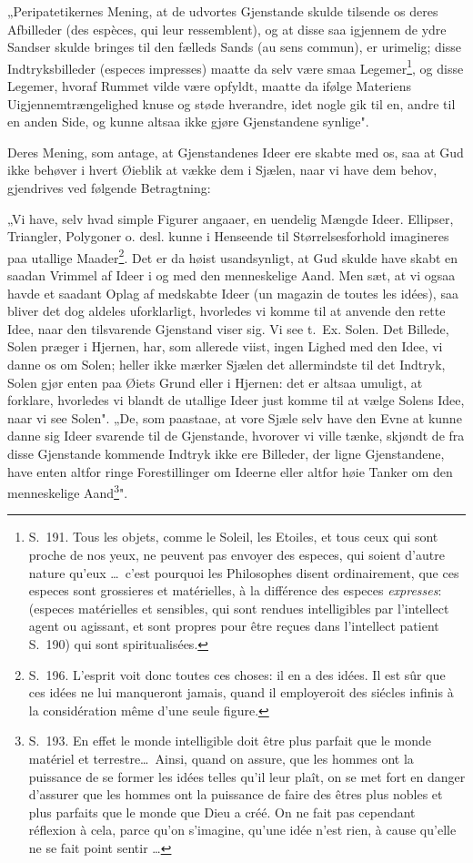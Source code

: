 \documentclass[12pt,a4paper]{article}
\newcommand{\opage}[1]{\marginnote{\footnotesize\textit{[#1]}}}
\begin{document}
„Peripatetikernes Mening, at de udvortes Gjenstande skulde tilsende os deres
Afbilleder (des espèces, qui leur ressemblent), og at disse saa igjennem de ydre
Sandser skulde bringes til den fælleds Sands (au sens commun),
\opage{14} er urimelig; disse Indtryksbilleder (especes impresses) maatte da selv være smaa
Legemer\footnote{S.~191. Tous les objets, comme le Soleil, les Etoiles, et tous
ceux qui sont proche de nos yeux, ne peuvent pas envoyer des especes, qui soient
d'autre nature qu'eux \dots\ c'est pourquoi les Philosophes disent ordinairement,
que ces especes sont grossieres et matérielles, à la différence des especes
\emph{expresses}: (especes matérielles et sensibles, qui sont rendues
intelligibles par l'intellect agent ou agissant, et sont propres pour être
reçues dans l'intellect patient S.~190) qui sont spiritualisées.}, og disse
Legemer, hvoraf Rummet vilde være opfyldt, maatte da ifølge Materiens
Uigjennemtrængelighed knuse og støde hverandre, idet nogle gik til en, andre til
en anden Side, og kunne altsaa ikke gjøre Gjenstandene synlige".

Deres Mening, som antage, at Gjenstandenes Ideer ere skabte med os, saa at Gud
ikke behøver i hvert Øieblik at vække dem i Sjælen, naar vi have dem behov,
gjendrives ved følgende Betragtning:

„Vi have, selv hvad simple Figurer angaaer, en uendelig Mængde Ideer. Ellipser,
Triangler, Polygoner o. desl. kunne i Henseende til Størrelsesforhold imagineres
paa utallige Maader\footnote{S.~196. L'esprit voit donc toutes ces choses: il en
a des idées. Il est sûr que ces idées ne lui manqueront jamais, quand il
employeroit des siécles infinis à la considération même d'une seule figure.}. Det
er da høist usandsynligt, at Gud skulde have skabt en saadan Vrimmel af Ideer i
og med den menneskelige Aand. Men sæt, at vi ogsaa havde et saadant Oplag af
medskabte Ideer (un magazin de toutes les idées), saa bliver det dog aldeles
uforklarligt, hvorledes vi komme til at anvende den rette Idee, naar den
tilsvarende Gjenstand viser sig. Vi see t.~Ex. Solen. Det Billede, Solen præger
i Hjernen, har, som allerede viist, ingen Lighed med den Idee, vi danne os om
Solen; heller ikke mærker Sjælen det allermindste til det Indtryk, Solen gjør
enten paa Øiets Grund eller i Hjernen: det er altsaa umuligt, at forklare,
hvorledes vi blandt de utallige Ideer just komme til at vælge Solens Idee, naar
vi see Solen".
\opage{15} „De, som paastaae, at vore Sjæle selv have den Evne at kunne danne sig Ideer
svarende til de Gjenstande, hvorover vi ville tænke, skjøndt de fra disse
Gjenstande kommende Indtryk ikke ere Billeder, der ligne Gjenstandene, have
enten altfor ringe Forestillinger om Ideerne eller altfor høie Tanker om den
menneskelige Aand\footnote{S.~193. En effet le monde intelligible doit être plus
parfait que le monde matériel et terrestre\dots\ Ainsi, quand on assure, que les
hommes ont la puissance de se former les idées telles qu'il leur plaît, on se met
fort en danger d'assurer que les hommes ont la puissance de faire des êtres plus
nobles et plus parfaits que le monde que Dieu a créé. On ne fait pas cependant
réflexion à cela, parce qu'on s'imagine, qu'une idée n'est rien, à cause qu'elle
ne se fait point sentir \dots}".
\end{document}
